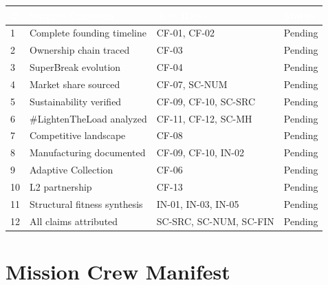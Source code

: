\documentclass[11pt,letterpaper]{article}
\newcommand{\tableheader}[1]{\textbf{\sffamily\textcolor{white}{#1}}}
\begin{document}
\begin{center}
\begin{tabularx}{\textwidth}{C{0.6cm}XL{3cm}C{1.5cm}}
\toprule
{}
\tableheader{\#} & \tableheader{Success Criterion} & \tableheader{Test ID(s)} & \tableheader{Status} \\
 & Complete founding timeline & CF-01, CF-02 & Pending \\
2 & Ownership chain traced & CF-03 & Pending \\
3 & SuperBreak evolution & CF-04 & Pending \\
4 & Market share sourced & CF-07, SC-NUM & Pending \\
5 & Sustainability verified & CF-09, CF-10, SC-SRC & Pending \\
6 & \#LightenTheLoad analyzed & CF-11, CF-12, SC-MH & Pending \\
7 & Competitive landscape & CF-08 & Pending \\
8 & Manufacturing documented & CF-09, CF-10, IN-02 & Pending \\
9 & Adaptive Collection & CF-06 & Pending \\
10 & L2 partnership & CF-13 & Pending \\
11 & Structural fitness synthesis & IN-01, IN-03, IN-05 & Pending \\
12 & All claims attributed & SC-SRC, SC-NUM, SC-FIN & Pending \\
\bottomrule
\end{tabularx}
\end{center}

\section{Mission Crew Manifest}
\end{document}

